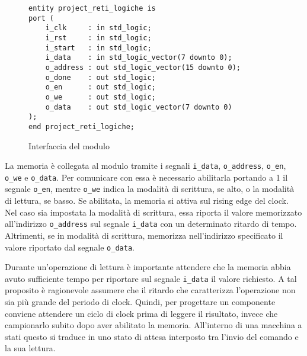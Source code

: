 \begin{figure}[!ht]
    \centering
    \begin{varwidth}{\linewidth}
        \begin{verbatim}
entity project_reti_logiche is
port (
    i_clk     : in std_logic;
    i_rst     : in std_logic;
    i_start   : in std_logic;
    i_data    : in std_logic_vector(7 downto 0);
    o_address : out std_logic_vector(15 downto 0);
    o_done    : out std_logic;
    o_en      : out std_logic;
    o_we      : out std_logic;
    o_data    : out std_logic_vector(7 downto 0)
);
end project_reti_logiche;
    \end{verbatim}
    \end{varwidth}
    \caption{Interfaccia del modulo}
    \label{code:interfacciacomponente}
\end{figure}

La memoria è collegata al modulo tramite i segnali \verb|i_data|, \verb|o_address|, \verb|o_en|, \verb|o_we| e \verb|o_data|. Per comunicare con essa è necessario abilitarla portando a 1 il segnale \verb|o_en|, mentre \verb|o_we| indica la modalità di scrittura, se alto, o la modalità di lettura, se basso. Se abilitata, la memoria si attiva sul rising edge del clock. Nel caso sia impostata la modalità di scrittura, essa riporta il valore memorizzato all'indirizzo \verb|o_address| sul segnale \verb|i_data| con un determinato ritardo di tempo. Altrimenti, se in modalità di scrittura, memorizza nell'indirizzo specificato il valore riportato dal segnale \verb|o_data|.

Durante un'operazione di lettura è importante attendere che la memoria abbia avuto sufficiente tempo per riportare sul segnale \verb|i_data| il valore richiesto. A tal proposito è ragionevole assumere che il ritardo che caratterizza l'operazione non sia più grande del periodo di clock. Quindi, per progettare un componente conviene attendere un ciclo di clock prima di leggere il risultato, invece che campionarlo subito dopo aver abilitato la memoria. All'interno di una macchina a stati questo si traduce in uno stato di attesa interposto tra l'invio del comando e la sua lettura.